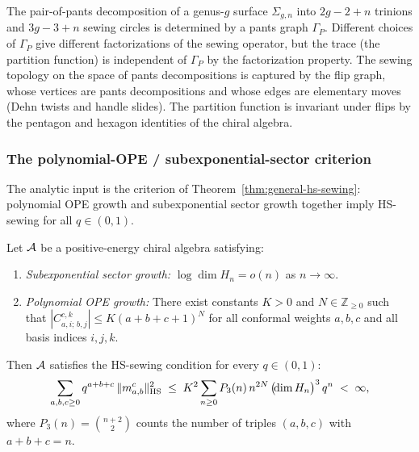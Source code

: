 \begin{remark}
The pair-of-pants decomposition of a genus-$g$ surface $\Sigma_{g,n}$ into $2g - 2 + n$ trinions and $3g - 3 + n$ sewing circles is determined by a pants graph $\Gamma_P$. Different choices of $\Gamma_P$ give different factorizations of the sewing operator, but the trace (the partition function) is independent of $\Gamma_P$ by the factorization property. The sewing topology on the space of pants decompositions is captured by the flip graph, whose vertices are pants decompositions and whose edges are elementary moves (Dehn twists and handle slides). The partition function is invariant under flips by the pentagon and hexagon identities of the chiral algebra.
\end{remark}

\subsubsection{The polynomial-OPE / subexponential-sector criterion}

The analytic input is the criterion of Theorem~\ref{thm:general-hs-sewing}: polynomial OPE growth and subexponential sector growth together imply HS-sewing for all $q \in (0,1)$.

\begin{theorem}
\label{thm:general-hs-sewing}
Let\/ $\mathcal{A}$ be a positive-energy chiral algebra satisfying:
\begin{enumerate}[label=\textup{(\alph*)}]
\item \emph{Subexponential sector growth:} $\log\dim H_n = o(n)$ as $n \to \infty$.
\item \emph{Polynomial OPE growth:} There exist constants $K > 0$ and $N \in \mathbb{Z}_{\geq 0}$ such that $|C^{c,k}_{a,i;\,b,j}| \leq K(a + b + c + 1)^N$ for all conformal weights $a,b,c$ and all basis indices $i,j,k$.
\end{enumerate}
Then $\mathcal{A}$ satisfies the HS-sewing condition for every $q \in (0,1)$:
\begin{equation}%
\sum_{a,b,c \geq 0} q^{a+b+c}\,\|m^c_{a,b}\|_{\HS}^2 \;\leq\; K^2 \sum_{n \geq 0} P_3(n)\,n^{2N}\, \bigl(\!\dim H_n\bigr)^3\,q^n \;<\; \infty,
\end{equation}
where $P_3(n) = \binom{n+2}{2}$ counts the number of triples $(a,b,c)$ with $a + b + c = n$.
\end{theorem}

